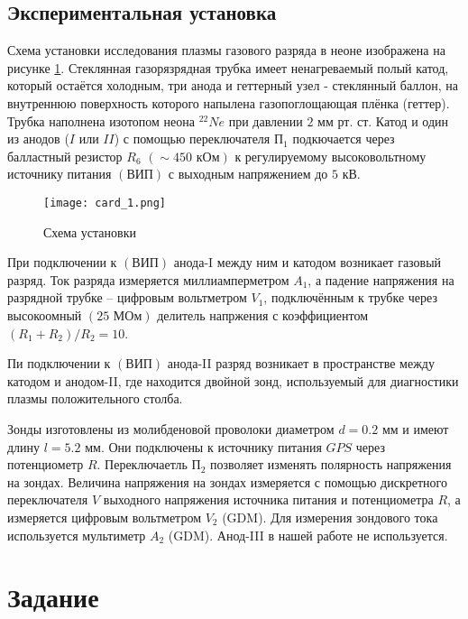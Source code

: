 \documentclass[a4paper,12pt]{article} %
\begin{document}
\subsection{Экспериментальная установка}

Схема установки исследования плазмы газового разряда в неоне изображена на рисунке \ref{img1}. Стеклянная газорязрядная трубка имеет ненагреваемый полый катод, который остаётся холодным, три анода и геттерный узел - стеклянный баллон, на внутреннюю поверхность которого напылена газопоглощающая плёнка (геттер). Трубка наполнена изотопом неона $^{22}{Ne}$ при давлении $2$ мм рт. ст. Катод и один из анодов ($I$ или $II$) с помощью переключателя $\text{П}_1$ подкючается через балластный резистор $R_6$ $(\sim 450 \text{ кОм})$ к регулируемому высоковольтному источнику питания $(\text{ВИП})$ с выходным напряжением до $5 \text{ кВ}$.

\begin{figure}[h]
\begin{center}
		\texttt{[image: card\_1.png]}
\end{center}
	\caption{Схема установки}
	\label{img1}
\end{figure}

При подключении к $(\text{ВИП})$ анода-I между ним и катодом возникает газовый разряд. Ток разряда измеряется миллиамперметром $A_1$, а падение напряжения на разрядной трубке -- цифровым вольтметром $V_1$, подключённым к трубке через высокоомный $(25 \text{ МОм})$ делитель напржения с коэффициентом $(R_1+R_2)/R_2 = 10$.

Пи подключении к $(\text{ВИП})$ анода-II разряд возникает в пространстве между катодом и анодом-II, где находится двойной зонд, используемый для диагностики плазмы положительного столба.

Зонды изготовлены из молибденовой проволоки диаметром $d=0.2 \text{ мм}$ и имеют длину $l = 5.2 \text{ мм}$. Они подключены к источнику питания $GPS$ через потенциометр $R$. Переключаетль $\text{П}_2$ позволяет изменять полярность напряжения на зондах. Величина напряжения на зондах измеряется с помощью дискретного переключателя $V$ выходного напряжения источника питания и потенциометра $R$, а измеряется цифровым вольтметром $V_2$ (GDM). Для измерения зондового тока используется мультиметр $A_2$ (GDM). Анод-III в нашей работе не используется.

\section{Задание}
\end{document}
